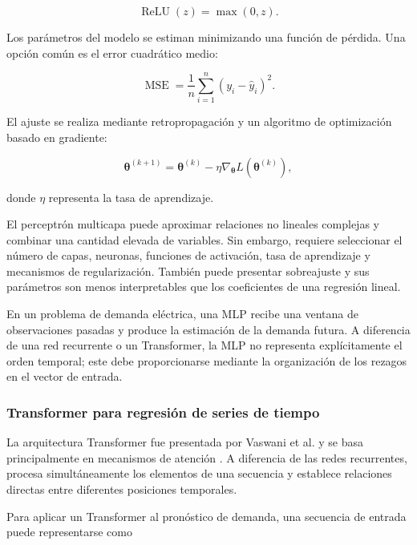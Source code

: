 \begin{equation}
    \operatorname{ReLU}(z)
    =
    \max(0,z).
\end{equation}

Los parámetros del modelo se estiman minimizando una función de pérdida. Una opción común es el error cuadrático medio:

\begin{equation}
    \operatorname{MSE}
    =
    \frac{1}{n}
    \sum_{i=1}^{n}
    \left(
        y_i-\hat{y}_i
    \right)^2.
\end{equation}

El ajuste se realiza mediante retropropagación y un algoritmo de optimización basado en gradiente:

\begin{equation}
    \boldsymbol{\theta}^{(k+1)}
    =
    \boldsymbol{\theta}^{(k)}
    -
    \eta
    \nabla_{\boldsymbol{\theta}}
    L(\boldsymbol{\theta}^{(k)}),
\end{equation}

donde $\eta$ representa la tasa de aprendizaje.

El perceptrón multicapa puede aproximar relaciones no lineales complejas y combinar una cantidad elevada de variables. Sin embargo, requiere seleccionar el número de capas, neuronas, funciones de activación, tasa de aprendizaje y mecanismos de regularización. También puede presentar sobreajuste y sus parámetros son menos interpretables que los coeficientes de una regresión lineal.

En un problema de demanda eléctrica, una MLP recibe una ventana de observaciones pasadas y produce la estimación de la demanda futura. A diferencia de una red recurrente o un Transformer, la MLP no representa explícitamente el orden temporal; este debe proporcionarse mediante la organización de los rezagos en el vector de entrada.

\subsubsection{Transformer para regresión de series de tiempo}
\label{sec:transformer}

La arquitectura Transformer fue presentada por Vaswani et al. y se basa principalmente en mecanismos de atención \cite{vaswani2017attention}. A diferencia de las redes recurrentes, procesa simultáneamente los elementos de una secuencia y establece relaciones directas entre diferentes posiciones temporales.

Para aplicar un Transformer al pronóstico de demanda, una secuencia de entrada puede representarse como

